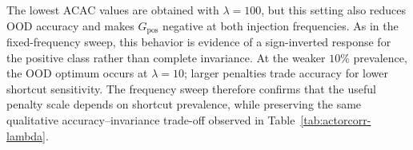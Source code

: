 \documentclass[11pt]{article}
\theoremstyle{definition}
\theoremstyle{plain}
\begin{document}
The lowest ACAC values are obtained with $\lambda=100$, but this setting also
reduces OOD accuracy and makes $G_{\mathrm{pos}}$ negative at both injection
frequencies. As in the fixed-frequency sweep, this behavior is evidence of a
sign-inverted response for the positive class rather than complete invariance.
At the weaker $10\%$ prevalence, the OOD optimum occurs at $\lambda=10$;
larger penalties trade accuracy for lower shortcut sensitivity. The frequency
sweep therefore confirms that the useful penalty scale depends on shortcut
prevalence, while preserving the same qualitative accuracy--invariance
trade-off observed in Table~\ref{tab:actorcorr-lambda}.
\end{document}
